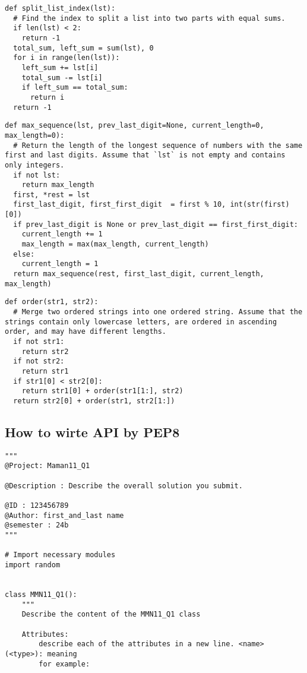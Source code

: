 \documentclass[11pt]{article}
\begin{document}
\begin{multicols}{2}
\begin{lstlisting}
def split_list_index(lst):
  # Find the index to split a list into two parts with equal sums.
  if len(lst) < 2:
    return -1
  total_sum, left_sum = sum(lst), 0
  for i in range(len(lst)):
    left_sum += lst[i]
    total_sum -= lst[i]
    if left_sum == total_sum:
      return i
  return -1
\end{lstlisting}

\begin{lstlisting}
def max_sequence(lst, prev_last_digit=None, current_length=0, max_length=0):
  # Return the length of the longest sequence of numbers with the same first and last digits. Assume that `lst` is not empty and contains only integers.
  if not lst:
    return max_length
  first, *rest = lst
  first_last_digit, first_first_digit  = first % 10, int(str(first)[0])
  if prev_last_digit is None or prev_last_digit == first_first_digit:
    current_length += 1
    max_length = max(max_length, current_length)
  else:
    current_length = 1
  return max_sequence(rest, first_last_digit, current_length, max_length)
\end{lstlisting}

\begin{lstlisting}
def order(str1, str2):
  # Merge two ordered strings into one ordered string. Assume that the strings contain only lowercase letters, are ordered in ascending order, and may have different lengths.
  if not str1:
    return str2
  if not str2:
    return str1
  if str1[0] < str2[0]:
    return str1[0] + order(str1[1:], str2)
  return str2[0] + order(str1, str2[1:])
\end{lstlisting}


\subsection{How to wirte API by PEP8}\label{sec:PEP8}
\vspace{-0.6cm}
\begin{multicols}{4}
\begin{lstlisting}
"""
@Project: Maman11_Q1

@Description : Describe the overall solution you submit.

@ID : 123456789
@Author: first_and_last name
@semester : 24b
"""

# Import necessary modules
import random


class MMN11_Q1():
    """
    Describe the content of the MMN11_Q1 class

    Attributes:
        describe each of the attributes in a new line. <name> (<type>): meaning
        for example:


\end{lstlisting}
\end{multicols}
\end{multicols}
\end{document}
